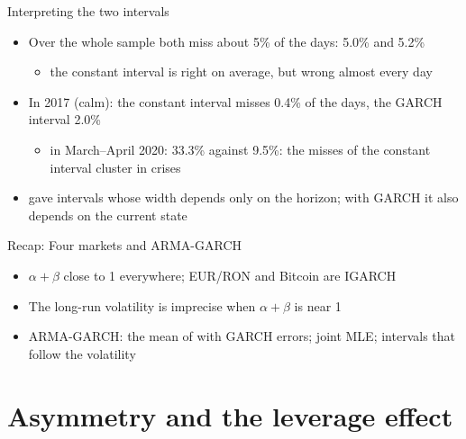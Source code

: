 \begin{frame}{Interpreting the two intervals}
\itemsize{\small}
\begin{itemize}
    \item Over the whole sample both miss about 5\% of the days: 5.0\% and 5.2\%
    \begin{itemize}
        \item the constant interval is right on average, but wrong almost every day
    \end{itemize}
    \item In 2017 (calm): the constant interval misses 0.4\% of the days, the GARCH interval 2.0\%
    \begin{itemize}
        \item in March--April 2020: 33.3\% against 9.5\%: the misses of the constant interval cluster in crises
    \end{itemize}
    \item {} gave intervals whose width depends only on the horizon; with GARCH it also depends on the current state
\end{itemize}
\end{frame}

\begin{frame}{Recap: Four markets and ARMA-GARCH}
\itemsize{\small}
\begin{itemize}
    \item $\alpha + \beta$ close to 1 everywhere; EUR/RON and Bitcoin are IGARCH
    \item The long-run volatility is imprecise when $\alpha + \beta$ is near 1
    \item ARMA-GARCH: the mean of  with GARCH errors; joint MLE; intervals that follow the volatility
\end{itemize}
\end{frame}


\section{Asymmetry and the leverage effect}

